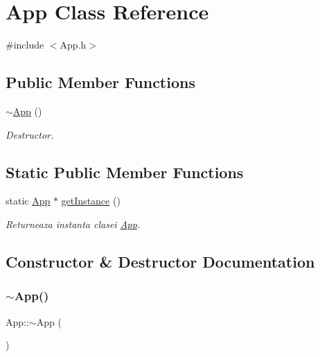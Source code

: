 \hypertarget{class_app}{}\section{App Class Reference}
\label{class_app}


{\ttfamily \#include $<$App.\+h$>$}

\subsection*{Public Member Functions}
\begin{DoxyCompactItemize}
\item 
\hyperlink{class_app_a34f1f253b1cef5f4ecbac66eaf6964ec}{$\sim$\+App} ()
\begin{DoxyCompactList}\small\item\em Destructor. \end{DoxyCompactList}\end{DoxyCompactItemize}
\subsection*{Static Public Member Functions}
\begin{DoxyCompactItemize}
\item 
static \hyperlink{class_app}{App} $\ast$ \hyperlink{class_app_a7e99b27b00ad6643bb09a7a43f579ba0}{get\+Instance} ()
\begin{DoxyCompactList}\small\item\em Returneaza instanta clasei \hyperlink{class_app}{App}. \end{DoxyCompactList}\end{DoxyCompactItemize}


\subsection{Constructor \& Destructor Documentation}
\mbox{\label{class_app_a34f1f253b1cef5f4ecbac66eaf6964ec}} 
\subsubsection{\texorpdfstring{$\sim$\+App()}{~App()}}
{\footnotesize\ttfamily App\+::$\sim$\+App (\begin{DoxyParamCaption}{ }\end{DoxyParamCaption})\hspace{0.3cm}{\ttfamily [inline]}}



